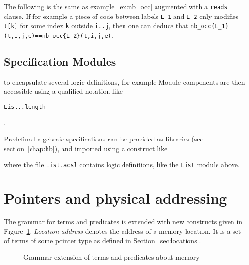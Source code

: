 \begin{example}
  The following is the same as example~\ref{ex:nb_occ} augmented with
  a \lstinline|reads| clause.
  If for example a
  piece of code between labels \lstinline|L_1| and \lstinline|L_2|
  only modifies \lstinline|t[k]| for
  some index \lstinline|k| outside \lstinline|i..j|, then one can deduce that
  \lstinline|nb_occ{L_1}(t,i,j,e)==nb_occ{L_2}(t,i,j,e)|.
\end{example}

\subsection{Specification Modules}
\label{sec:specmodules}

\experimental

 to encapsulate
several logic definitions, for example
Module components are then accessible using a qualified notation like
\begin{notimplementedenv}\lstinline|List::length|\end{notimplementedenv}.

Predefined algebraic specifications can be provided as
libraries (see
section~\ref{chap:lib}), and imported using a construct like
\begin{notimplementedenv}
\end{notimplementedenv}
where the file \lstinline|List.acsl| contains logic
definitions, like the \lstinline|List| module above.



\section{Pointers and physical addressing}
\label{sec:pointers} 
The grammar for terms and predicates is
extended with new constructs given in Figure~\ref{fig:gram:memory}. 
\textsl{Location-address} denotes the address of a memory location. 
It is a set of terms of some pointer type as defined in Section~\ref{sec:locations}.

\begin{figure}[t]
  \begin{cadre}
      
    \end{cadre}
  \caption{Grammar extension of terms and predicates about memory}
\label{fig:gram:memory}
\end{figure}




